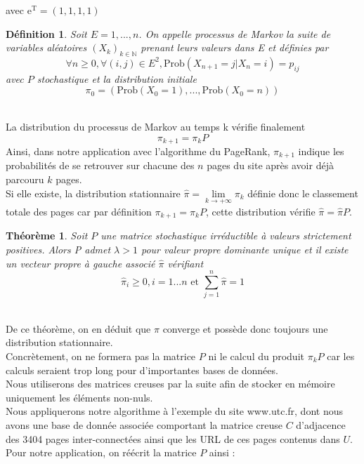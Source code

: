         avec e$^\text{T}= (1,1,1,1)$
        \newtheorem*{definition}{Définition}
        \begin{definition}
            Soit $E={1,...,n}$. On appelle processus de Markov la suite de variables aléatoires $(X_k)_{k\in \mathbb{N}}$ prenant leurs valeurs dans E et définies par
            $$
            \forall n \geq 0, \forall (i,j) \in E^2, \text{Prob}(X_{n+1} = j | X_n = i) = p_{ij} 
            $$
            avec $P$ stochastique et la distribution initiale
            $$\pi_0 = (\text{Prob}(X_{0} = 1 ),...,\text{Prob}(X_{0} = n))$$
        \end{definition}\phantom{}\\La distribution du processus de Markov au temps k vérifie finalement $$\pi_{k+1} = \pi_kP$$
        Ainsi, dans notre application avec l'algorithme du PageRank, $\pi_{k+1}$ indique les probabilités de se retrouver sur chacune des $n$ pages du site après avoir déjà parcouru $k$ pages.\\
        Si elle existe, la distribution stationnaire $\hat{\pi} = \lim\limits_{k\to +\infty}\pi_k$ définie donc le classement totale des pages car par définition $\pi_{k+1} = \pi_kP$, cette distribution vérifie $\hat{\pi} = \hat{\pi}P$.
        \newtheorem*{theoreme*}{Théorème}
        \begin{theoreme*}
            Soit $P$ une matrice stochastique irréductible à valeurs strictement positives. Alors P admet $\lambda>1$ pour valeur propre dominante unique et il existe un vecteur propre à gauche associé $\hat{\pi}$ vérifiant$$\hat{\pi}_i\geq 0, i = 1 ...n \text{ et } \sum^n_{j=1}\hat{\pi}=1$$
        \end{theoreme*}
        \phantom{}\\De ce théorème, on en déduit que $\pi$ converge et possède donc toujours une distribution stationnaire.\\
        Concrètement, on ne formera pas la matrice $P$ ni le calcul du produit $\pi_kP$ car les calculs seraient trop long pour d'importantes bases de données.\\
        Nous utiliserons des matrices creuses par la suite afin de stocker en mémoire uniquement les éléments non-nuls.\\
        Nous appliquerons notre algorithme à l'exemple du site www.utc.fr, dont nous avons une base de donnée associée comportant la matrice creuse $C$ d'adjacence des 3404 pages inter-connectées ainsi que les URL de ces pages contenus dans $U$.
        \\Pour notre application, on réécrit la matrice $P$ ainsi :
